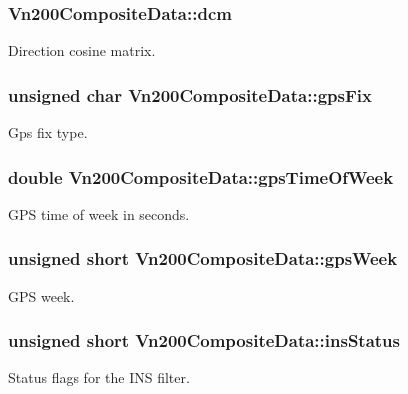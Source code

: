 \subsubsection[{\texorpdfstring{dcm}{dcm}}]{ Vn200\+Composite\+Data\+::dcm}\hypertarget{structVn200CompositeData_a9394f78f541bcbc7cd16186199f34206}{}\label{structVn200CompositeData_a9394f78f541bcbc7cd16186199f34206}
Direction cosine matrix. 
\subsubsection[{\texorpdfstring{gps\+Fix}{gpsFix}}]{\setlength{\rightskip}{0pt plus 5cm}unsigned char Vn200\+Composite\+Data\+::gps\+Fix}\hypertarget{structVn200CompositeData_a4ad8ffd8bff4d46b04eecea6ed9ecfd5}{}\label{structVn200CompositeData_a4ad8ffd8bff4d46b04eecea6ed9ecfd5}
Gps fix type. 
\subsubsection[{\texorpdfstring{gps\+Time\+Of\+Week}{gpsTimeOfWeek}}]{\setlength{\rightskip}{0pt plus 5cm}double Vn200\+Composite\+Data\+::gps\+Time\+Of\+Week}\hypertarget{structVn200CompositeData_afdf82529eb5b04077aee739afe317bcf}{}\label{structVn200CompositeData_afdf82529eb5b04077aee739afe317bcf}
G\+PS time of week in seconds. 
\subsubsection[{\texorpdfstring{gps\+Week}{gpsWeek}}]{\setlength{\rightskip}{0pt plus 5cm}unsigned short Vn200\+Composite\+Data\+::gps\+Week}\hypertarget{structVn200CompositeData_acb1f26f310415fe01af3a5251b4b66db}{}\label{structVn200CompositeData_acb1f26f310415fe01af3a5251b4b66db}
G\+PS week. 
\subsubsection[{\texorpdfstring{ins\+Status}{insStatus}}]{\setlength{\rightskip}{0pt plus 5cm}unsigned short Vn200\+Composite\+Data\+::ins\+Status}\hypertarget{structVn200CompositeData_a02f038d8695242bedff6412571e4bd93}{}\label{structVn200CompositeData_a02f038d8695242bedff6412571e4bd93}
Status flags for the I\+NS filter. 
